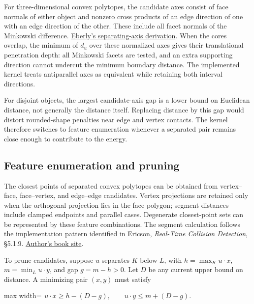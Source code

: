 \documentclass[11pt,a4paper]{article}
\begin{document}
For three-dimensional convex polytopes, the candidate axes consist of face normals of either object and nonzero cross products of an edge direction of one with an edge direction of the other. These include all facet normals of the Minkowski difference. \href{https://www.geometrictools.com/Documentation/MethodOfSeparatingAxes.pdf}{Eberly's separating-axis derivation}. When the cores overlap, the minimum of \(d_u\) over these normalized axes gives their translational penetration depth: all Minkowski facets are tested, and an extra supporting direction cannot undercut the minimum boundary distance. The implemented kernel treats antiparallel axes as equivalent while retaining both interval directions.

For disjoint objects, the largest candidate-axis gap is a lower bound on Euclidean distance, not generally the distance itself. Replacing distance by this gap would distort rounded-shape penalties near edge and vertex contacts. The kernel therefore switches to feature enumeration whenever a separated pair remains close enough to contribute to the energy.

\subsection{Feature enumeration and pruning}

The closest points of separated convex polytopes can be obtained from vertex--face, face--vertex, and edge--edge candidates. Vertex projections are retained only when the orthogonal projection lies in the face polygon; segment distances include clamped endpoints and parallel cases. Degenerate closest-point sets can be represented by these feature combinations. The segment calculation follows the implementation pattern identified in Ericson, \emph{Real-Time Collision Detection}, §5.1.9. \href{https://realtimecollisiondetection.net/books/rtcd/}{Author's book site}.

To prune candidates, suppose \(u\) separates \(K\) below \(L\), with \(h=\max_Ku\cdot x\), \(m=\min_Lu\cdot y\), and gap \(g=m-h>0\). Let \(D\) be any current upper bound on distance. A minimizing pair \((x,y)\) must satisfy

\begin{center}\begin{adjustbox}{max width=\linewidth}$\displaystyle\begin{aligned}
u\cdot x\ge h-(D-g),\qquad u\cdot y\le m+(D-g).
\end{aligned}$\end{adjustbox}\end{center}
\end{document}
